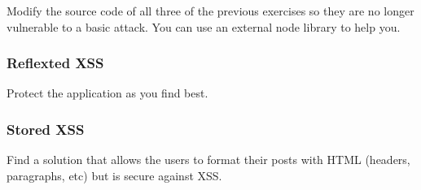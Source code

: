 \begin{Exercise}[label={websec-xss-prevention}]
	Modify the source code of all three of the previous exercises so they are no longer vulnerable to a basic attack. You can use an external node library to help you.
	\subsubsection{Reflexted XSS}
	Protect the application as you find best.
	\subsubsection{Stored XSS}
	Find a solution that allows the users to format their posts with HTML (headers, paragraphs, etc) but is secure against XSS.
\end{Exercise}


